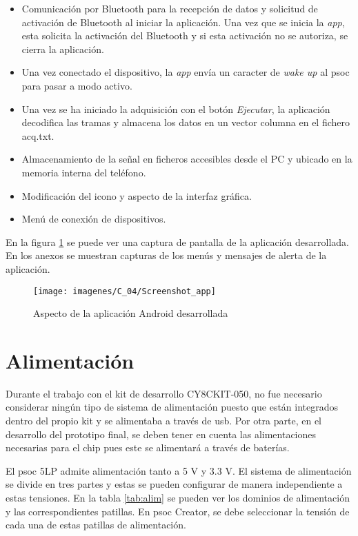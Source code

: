 \begin{itemize}
	\item Comunicación por Bluetooth para la recepción de datos y solicitud de activación de Bluetooth al iniciar la aplicación. Una vez que se inicia la \textit{app}, esta solicita la activación del Bluetooth y si esta activación no se autoriza, se cierra la aplicación.
	\item Una vez conectado el dispositivo, la \textit{app} envía un caracter de \textit{wake up} al \acrshort{psoc} para pasar a modo activo.
	\item Una vez se ha iniciado la adquisición con el botón \textit{Ejecutar}, la aplicación decodifica las tramas y almacena los datos en un vector columna en el fichero acq.txt.	
	\item Almacenamiento de la señal en ficheros accesibles desde el PC y ubicado en la memoria interna del teléfono.
	\item Modificación del icono y aspecto de la interfaz gráfica.
	\item Menú de conexión de dispositivos.
\end{itemize}

En la figura \ref{fig:app_screen} se puede ver una captura de pantalla de la aplicación desarrollada. En los anexos se muestran capturas de los menús y mensajes de alerta de la aplicación.

\begin{figure}[!ht]
	\center
	\texttt{[image: imagenes/C\_04/Screenshot\_app]}
	\caption{Aspecto de la aplicación Android desarrollada}
	\label{fig:app_screen}
\end{figure}

\section{Alimentación}

Durante el trabajo con el kit de desarrollo CY8CKIT-050, no fue necesario considerar ningún tipo de sistema de alimentación puesto que están integrados dentro del propio kit y se alimentaba a través de  \acrshort{usb}. Por otra parte, en el desarrollo del prototipo final, se deben tener en cuenta las alimentaciones necesarias para el chip pues este se alimentará a través de baterías. 

El \acrshort{psoc} 5LP admite alimentación tanto a 5 V y 3.3 V. El sistema de alimentación se divide en tres partes y estas se pueden configurar de manera independiente a estas tensiones. En la tabla \ref{tab:alim} se pueden ver los dominios de alimentación y las correspondientes patillas. En \acrshort{psoc} Creator, se debe seleccionar la tensión de cada una de estas patillas de alimentación.

